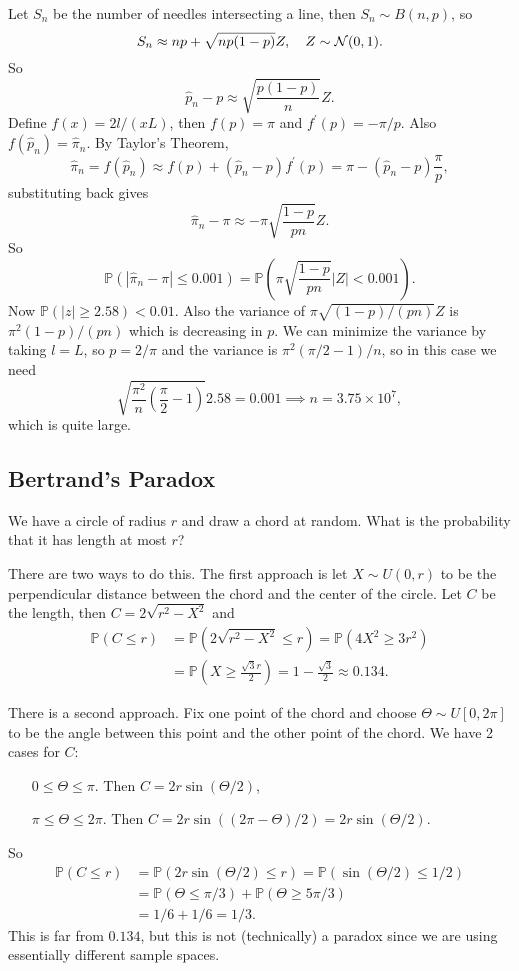 Let $S_n$ be the number of needles intersecting a line, then $S_n\sim B(n,p)$, so 
\[
    S_n\approx np+\sqrt{np(1-p)}Z,\quad Z \sim {\mathcal{N}}(0,1).
\]
So
\[
    \hat{p}_n-p\approx \sqrt{\frac{p(1-p)}{n}}Z.
\]
Define $f(x)=2 l /(xL)$, then $f(p)=\pi$ and $f^\prime(p)=-\pi/p$. Also $f(\hat{p}_n)=\hat\pi_n$.
By Taylor's Theorem,
$$\hat\pi_n=f(\hat{p}_n)\approx f(p)+(\hat{p}_n-p)f^\prime(p)=\pi-(\hat{p}_n-p)\frac{\pi}{p},$$
substituting back gives
$$\hat\pi_n-\pi\approx-\pi\sqrt{\frac{1-p}{pn}}Z.$$
So
$$\mathbb P(|\hat\pi_n-\pi|\le 0.001)=\mathbb P\left( \pi\sqrt{\frac{1-p}{pn}}|Z|<0.001 \right).$$
Now $\mathbb P(|z|\ge 2.58)<0.01$.
Also the variance of $\pi\sqrt{(1-p)/(pn)}Z$ is $\pi^2(1-p)/(pn)$ which is decreasing in $p$.
We can minimize the variance by taking $ l =L$, so $p=2/\pi$ and the variance is $\pi^2(\pi/2-1)/n$, so in this case we need
$$\sqrt{\frac{\pi^2}{n}(\frac{\pi}{2}-1)}2.58=0.001\implies n=3.75\times 10^7,$$
which is quite large.

\subsection{Bertrand's Paradox}
We have a circle of radius $r$ and draw a chord at random.
What is the probability that it has length at most $r$?

There are two ways to do this.
The first approach is let $X\sim U(0,r)$ to be the perpendicular distance between the chord and the center of the circle.
Let $C$ be the length, then $ C = 2 \sqrt{r^2-X^2} $ and 
\begin{align*}
    \mathbb{P}(C\le r)&= \mathbb{P}(2 \sqrt{r^2-X^2}\le r)
    = \mathbb{P}(4X^2\ge 3r^2)\\ 
    &= \mathbb{P}\left( X\ge \frac{\sqrt{3}r}{2} \right)
    = 1-\frac{\sqrt{3}}{2}\approx 0.134.
\end{align*}

There is a second approach.
Fix one point of the chord and choose $\Theta\sim U[0,2\pi]$ to be the angle between this point and the other point of the chord. We have 2 cases for $C$:
\begin{itemize}[align=left]
    \item[$ 0\le \Theta\le \pi $.] Then $ C=2r \sin (\Theta/2) $,
    \item[$ \pi\le \Theta\le 2\pi $.] Then $ C=2r \sin ((2\pi-\Theta)/2)=2r \sin (\Theta/2) $.
\end{itemize}
So 
\begin{align*}
    \mathbb{P}(C\le r)&= \mathbb{P}(2r \sin (\Theta/2)\le r)=\mathbb{P}(\sin (\Theta/2)\le 1/2)\\ 
    &= \mathbb{P}(\Theta\le \pi/3) + \mathbb{P}(\Theta\ge 5\pi/3)\\ 
    &= 1/6+1/6=1/3.
\end{align*}
This is far from $ 0.134 $, but this is not (technically) a paradox since we are using essentially different sample spaces.